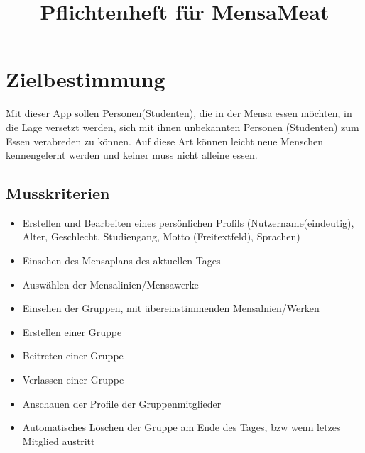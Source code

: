 \documentclass[a4paper]{scrreprt}
\begin{document}
\title{Pflichtenheft für MensaMeat}

\maketitle
 
\tableofcontents
 
\chapter{Zielbestimmung}
Mit dieser App sollen Personen(Studenten), die in der Mensa essen möchten, in die Lage versetzt werden, sich mit ihnen unbekannten Personen (Studenten) zum Essen verabreden zu können. Auf diese Art können leicht neue Menschen kennengelernt werden und keiner muss nicht alleine essen.
 
\section{Musskriterien}
\begin{itemize}


\item Erstellen und Bearbeiten eines persönlichen Profils (Nutzername(eindeutig), Alter, Geschlecht, Studiengang, Motto (Freitextfeld), Sprachen)
\item Einsehen des Mensaplans des aktuellen Tages
\item Auswählen der Mensalinien/Mensawerke
\item Einsehen der Gruppen, mit übereinstimmenden Mensalnien/Werken
\item Erstellen einer Gruppe
\item Beitreten einer Gruppe
\item Verlassen einer Gruppe
\item Anschauen der Profile der Gruppenmitglieder
\item Automatisches Löschen der Gruppe am Ende des Tages, bzw wenn letzes Mitglied austritt
\end{itemize}
\end{document}
